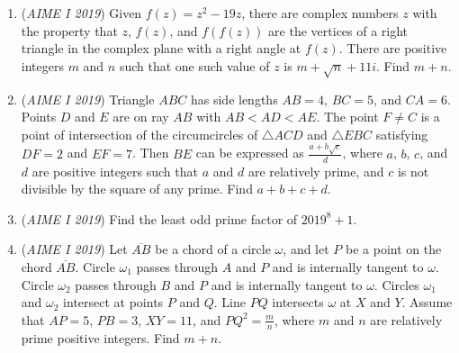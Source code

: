 \begin{enumerate}
 

	\item (\textit{AIME I 2019}) Given $f(z) = z^2-19z$, there are complex numbers $z$ with the property that $z$, $f(z)$, and $f(f(z))$ are the vertices of a right triangle in the complex plane with a right angle at $f(z)$. There are positive integers $m$ and $n$ such that one such value of $z$ is $m+\sqrt{n}+11i$. Find $m+n$.


 

	\item (\textit{AIME I 2019}) Triangle $ABC$ has side lengths $AB=4$, $BC=5$, and $CA=6$. Points $D$ and $E$ are on ray $AB$ with $AB<AD<AE$. The point $F \neq C$ is a point of intersection of the circumcircles of $\triangle ACD$ and $\triangle EBC$ satisfying $DF=2$ and $EF=7$. Then $BE$ can be expressed as $\frac{a+b\sqrt{c}}{d}$, where $a$, $b$, $c$, and $d$ are positive integers such that $a$ and $d$ are relatively prime, and $c$ is not divisible by the square of any prime. Find $a+b+c+d$.


 

	\item (\textit{AIME I 2019}) Find the least odd prime factor of $2019^8 + 1$.


 

	\item (\textit{AIME I 2019}) Let $\overline{AB}$ be a chord of a circle $\omega$, and let $P$ be a point on the chord $\overline{AB}$. Circle $\omega_1$ passes through $A$ and $P$ and is internally tangent to $\omega$. Circle $\omega_2$ passes through $B$ and $P$ and is internally tangent to $\omega$. Circles $\omega_1$ and $\omega_2$ intersect at points $P$ and $Q$. Line $PQ$ intersects $\omega$ at $X$ and $Y$. Assume that $AP=5$, $PB=3$, $XY=11$, and $PQ^2 = \frac{m}{n}$, where $m$ and $n$ are relatively prime positive integers. Find $m+n$.


 

\end{enumerate}